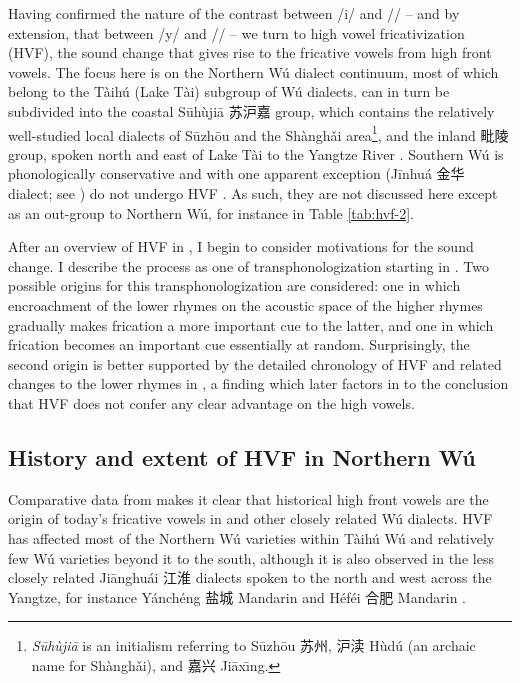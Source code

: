 \documentclass[output=paper,hidelinks]{langscibook}
\begin{document}
Having confirmed the nature of the contrast between /i/ and /\iz{}/ -- and by extension, that between /y/ and /\yz{}/ -- we turn to high vowel fricativization (HVF), the sound change that gives rise to the fricative vowels from high front vowels. The focus here is on the Northern Wú dialect continuum, most of which belong to the Tàihú (Lake Tài) subgroup of Wú dialects. \THW{} can in turn be subdivided into the coastal S\=uh\`uji\=a {\cjkfont 苏沪嘉} group, which contains the relatively well-studied local dialects of S\=uzh\=ou  and the Shàngh\v{a}i area\footnote{\textit{S\=uh\`uji\=a} is an initialism referring to S\=uzh\=ou {\cjkfont 苏州}, {\cjkfont 沪渎} H\`udú (an archaic name for Shàngh\v{a}i), and {\cjkfont 嘉兴} Ji\=ax\={\i}ng.}, and the inland  {\cjkfont 毗陵} group, spoken north and east of Lake Tài to the Yangtze River \citep[2--3]{qian}.
%
Southern Wú is phonologically conservative and with one apparent exception (Jīnhuá {\cjkfont 金华} dialect; see \citealt{qian}) do not undergo HVF \citep[229]{cao-southern}. As such, they are not discussed here except as an out-group to Northern Wú, for instance in Table \ref{tab:hvf-2}.

After an overview of HVF in \THW{}, I begin to consider motivations for the sound change.
%
I describe the process as one of transphonologization starting in .
%
Two possible origins for this transphonologization are considered: one in which encroachment of the lower rhymes on the acoustic space of the higher rhymes gradually makes frication a more important cue to the latter, and one in which frication becomes an important cue essentially at random.
%
Surprisingly, the second origin is better supported by the detailed chronology of HVF and related changes to the lower rhymes in \THW{},
%
a finding which later factors in to the conclusion that HVF does not confer any clear advantage on the \THW{} high vowels.


\subsection{History and extent of HVF in Northern Wú} \label{history-section} \label{sec:faytak:3.1}

Comparative data from  makes it clear that historical high front vowels are the origin of today's fricative vowels in \SC{} and other closely related Wú dialects. HVF has affected most of the Northern Wú varieties within Tàihú Wú and relatively few Wú varieties beyond it to the south, although it is also observed in the less closely related Ji\={a}nghu\'{a}i {\cjkfont 江淮}  dialects spoken to the north and west across the Yangtze, for instance Y\'anch\'eng {\cjkfont 盐城} Mandarin \citep{cai-yancheng} and H\'ef\'ei {\cjkfont 合肥} Mandarin \citep{hou-hefei, kong-etal}.
\end{document}
